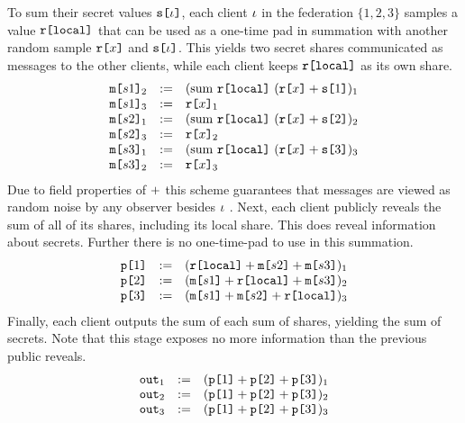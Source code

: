 To sum their secret values $\texttt{s[}\iota\texttt{]}$, each client $\iota$ in
the federation $\{ 1, 2, 3 \}$  samples a value $\texttt{r[}\mathtt{local}\texttt{]}$
that can be used as a one-time pad in summation with another
random sample $\texttt{r[}x\texttt{]}$ and $\texttt{s[}\iota\texttt{]}$. This yields
two secret shares communicated as messages to the other clients,
while each client keeps $\texttt{r[}\mathtt{local}\texttt{]}$ as its own share.
$$
\begin{array}{lll}
  \texttt{m[}s1\texttt{]}_{2} &:=& (\mathrm{sum}\ \texttt{r[}\mathtt{local}\texttt{]}\ (\texttt{r[}x\texttt{]} + \texttt{s[}1\texttt{]})_{1} \\ 
  \texttt{m[}s1\texttt{]}_{3} &:=& \texttt{r[}x\texttt{]}_{1} \\ 
  \texttt{m[}s2\texttt{]}_{1} &:=& (\mathrm{sum}\ \texttt{r[}\mathtt{local}\texttt{]}\ (\texttt{r[}x\texttt{]} + \texttt{s[}2\texttt{]})_{2} \\ 
  \texttt{m[}s2\texttt{]}_{3} &:=& \texttt{r[}x\texttt{]}_{2} \\ 
  \texttt{m[}s3\texttt{]}_{1} &:=& (\mathrm{sum}\ \texttt{r[}\mathtt{local}\texttt{]}\ (\texttt{r[}x\texttt{]} + \texttt{s[}3\texttt{]})_{3} \\ 
  \texttt{m[}s3\texttt{]}_{2} &:=& \texttt{r[}x\texttt{]}_{3}
\end{array}
$$
Due to field properties of $+$ this scheme guarantees that messages
are viewed as random noise by any observer 
besides $\iota$ \cite{barthe2019probabilistic}. Next, each client
publicly reveals the sum of all of its shares, including its local
share. This does reveal information about secrets. Further there
is no one-time-pad to use in this summation.
$$
\begin{array}{lll}
  \texttt{p[}1\texttt{]} &:=& (\texttt{r[}\mathtt{local}\texttt{]} + \texttt{m[}s2\texttt{]} + \texttt{m[}s3\texttt{]})_{1} \\ 
  \texttt{p[}2\texttt{]} &:=& (\texttt{m[}s1\texttt{]} + \texttt{r[}\mathtt{local}\texttt{]} + \texttt{m[}s3\texttt{]})_{2} \\
  \texttt{p[}3\texttt{]} &:=& (\texttt{m[}s1\texttt{]} + \texttt{m[}s2\texttt{]} + \texttt{r[}\mathtt{local}\texttt{]})_{3} 
\end{array}
$$
Finally, each client outputs the sum of each sum of shares, yielding
the sum of secrets. Note that this stage exposes no more information
than the previous public reveals. 
$$
\begin{array}{lll}
  \texttt{out}_{1} &:=& (\texttt{p[}1\texttt{]} + \texttt{p[}2\texttt{]} + \texttt{p[}3\texttt{]})_{1}\\
  \texttt{out}_{2} &:=& (\texttt{p[}1\texttt{]} + \texttt{p[}2\texttt{]} + \texttt{p[}3\texttt{]})_{2}\\
  \texttt{out}_{3} &:=& (\texttt{p[}1\texttt{]} + \texttt{p[}2\texttt{]} + \texttt{p[}3\texttt{]})_{3}
\end{array}
$$
